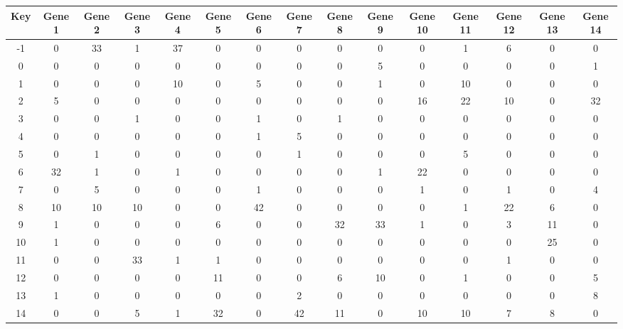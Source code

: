 \begin{tabular}{|c|c|c|c|c|c|c|c|c|c|c|c|c|c|c|}
\hline
Key & Gene 1 & Gene 2 & Gene 3 & Gene 4 & Gene 5 & Gene 6 & Gene 7 & Gene 8 & Gene 9 & Gene 10 & Gene 11 & Gene 12 & Gene 13 & Gene 14 \\
\hline
-1 & 0 & 33 & 1 & 37 & 0 & 0 & 0 & 0 & 0 & 0 & 1 & 6 & 0 & 0 \\
0 & 0 & 0 & 0 & 0 & 0 & 0 & 0 & 0 & 5 & 0 & 0 & 0 & 0 & 1 \\
1 & 0 & 0 & 0 & 10 & 0 & 5 & 0 & 0 & 1 & 0 & 10 & 0 & 0 & 0 \\
2 & 5 & 0 & 0 & 0 & 0 & 0 & 0 & 0 & 0 & 16 & 22 & 10 & 0 & 32 \\
3 & 0 & 0 & 1 & 0 & 0 & 1 & 0 & 1 & 0 & 0 & 0 & 0 & 0 & 0 \\
4 & 0 & 0 & 0 & 0 & 0 & 1 & 5 & 0 & 0 & 0 & 0 & 0 & 0 & 0 \\
5 & 0 & 1 & 0 & 0 & 0 & 0 & 1 & 0 & 0 & 0 & 5 & 0 & 0 & 0 \\
6 & 32 & 1 & 0 & 1 & 0 & 0 & 0 & 0 & 1 & 22 & 0 & 0 & 0 & 0 \\
7 & 0 & 5 & 0 & 0 & 0 & 1 & 0 & 0 & 0 & 1 & 0 & 1 & 0 & 4 \\
8 & 10 & 10 & 10 & 0 & 0 & 42 & 0 & 0 & 0 & 0 & 1 & 22 & 6 & 0 \\
9 & 1 & 0 & 0 & 0 & 6 & 0 & 0 & 32 & 33 & 1 & 0 & 3 & 11 & 0 \\
10 & 1 & 0 & 0 & 0 & 0 & 0 & 0 & 0 & 0 & 0 & 0 & 0 & 25 & 0 \\
11 & 0 & 0 & 33 & 1 & 1 & 0 & 0 & 0 & 0 & 0 & 0 & 1 & 0 & 0 \\
12 & 0 & 0 & 0 & 0 & 11 & 0 & 0 & 6 & 10 & 0 & 1 & 0 & 0 & 5 \\
13 & 1 & 0 & 0 & 0 & 0 & 0 & 2 & 0 & 0 & 0 & 0 & 0 & 0 & 8 \\
14 & 0 & 0 & 5 & 1 & 32 & 0 & 42 & 11 & 0 & 10 & 10 & 7 & 8 & 0 \\
\hline
\end{tabular}